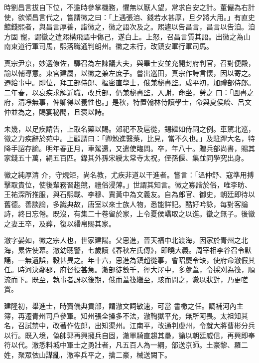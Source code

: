 \begin{pinyinscope}
 時劉昌言拔自下位，不逾時參掌機務，懼無以厭人望，常求自安之計。董儼為右計使，欲傾昌言代之，嘗謂徽之曰：「上遇張洎、錢若水甚厚，旦夕將大用。」有直史館錢熙者，與昌言厚善，詣徽之，徽之語次及之。熙遽以告昌言，昌言以告洎。洎方固
 寵，謂徽之遣熙構飛語中傷己，遂白上。上怒，召昌言質其語。出徽之為山南東道行軍司馬，熙落職通判朗州。徽之未行，改鎮安軍行軍司馬。



 真宗尹京，妙選僚佐，驛召為左諫議大夫，與畢士安並充開封府判官，召對便殿，諭以輔導意。東宮建屬，以徽之兼左庶子。嘗出巡田，真宗作詩言懷，因以寄之。遷給事中。即位，拜工部侍郎、樞密直學士，俄兼秘書監。咸平初，加禮部侍郎。二年春，以衰疾求解近職，改兵部，仍兼秘書監，入謝，命坐，勞之
 曰：「圖書之府，清凈無事，俾卿得以養性也。」是秋，特置翰林侍讀學士，命與夏侯嶠、呂文仲並為之，賜宴秘閣，且褒以詩。



 未幾，以足疾請告，上取名藥以賜。郊祀不及扈從，錫繼如侍祠之例。車駕北巡，徽之力疾辭於苑中。上顧謂曰：「卿勉進醫藥，比見，當不久也。」及駐蹕大名，特降手詔存諭。明年春正月，車駕還，又遣使臨問。卒，年八十。贈兵部尚書，賜其家錢五十萬，絹五百匹。錄其外孫宋綬太常寺太祝，侄孫偃、集並同學究出身。



 徽之純厚清
 介，守規矩，尚名教，尤疾非道以干進者。嘗言：「溫仲舒、寇準用搏擊取貴位，使後輩務習趨競，禮俗浸薄。」世謂其知言。徽之寡諧於俗，唯李昉、王祐深所推服，與石熙載、李穆、賈黃中為文義友。自為郎官、御史，朝廷即待以舊德。善談論，多識典故，唐室以來士族人物，悉能詳記。酷好吟詠，每對客論詩，終日忘倦。既沒，有集二十卷留於家，上令夏侯嶠取之以進。徽之無子。後徽之妻王卒，及葬，復以緡帛賜其家。



 澈字晏如，徽之宗人也，世家建陽。父思進，晉天福中北渡海，因家於青州之北海，累佐使幕。澈幼聰警，七歲讀《春秋左氏傳》，即曉大義。周宰相李谷召令默誦，一無遺誤，穀甚異之。年十六，思進為鎮趙從事，會昭慶令缺，使府命澈假其任。時河決鄰郡，府督役甚急。澈部徒數千，徑大澤中，多蘆葦，令採刈為筏，順流而下。既至，執事者訝以後期，俄而葦筏繼至，駭而問之，澈以狀對，乃更嗟賞。



 建隆初，舉進士，時竇儀典貢部，謂澈文詞敏速，可當
 書檄之任。調補河內主簿，再遷青州司戶參軍。知州張全操多不法，澈鞫獄平允，無所阿畏。太祖知其名，召試禁中，改著作佐郎，出知渠州。江南平，改通判虔州，令就大將曹彬分兵以行。既入境，偽帥郭再興擁兵自固，澈單騎直趨其壘，諭以朝廷威信，再興即奉符以代。澈悉料城中軍士之勇壯者，凡五百人為一綱，部送京師。土豪黎、羅二姓，聚眾依山謀亂，澈率兵平之，擒二豪，械送闕下。




\end{pinyinscope}
